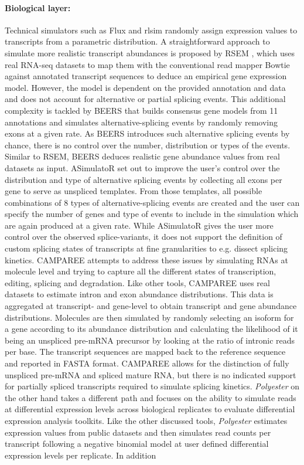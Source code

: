 \paragraph{Biological layer:} Technical simulators such as Flux \citep{Griebel2012} and rlsim \citep{https://doi.org/10.48550/arxiv.1308.3172} randomly assign expression values to transcripts from a parametric distribution. A straightforward approach to simulate more realistic transcript abundances is proposed by RSEM \citep{Li2011}, which uses real RNA-seq datasets to map them with the conventional read mapper Bowtie against annotated transcript sequences to deduce an empirical gene expression model. However, the model is dependent on the provided annotation and data and does not account for alternative or partial splicing events. This additional complexity is tackled by BEERS \citep{Grant2011} that builds consensus gene models from 11 annotations and simulates alternative-splicing events by randomly removing exons at a given rate. As BEERS introduces such alternative splicing events by chance, there is no control over the number, distribution or types of the events. Similar to RSEM, BEERS deduces realistic gene abundance values from real datasets as input. ASimulatoR \citep{Manz2021} set out to improve the user's control over the distribution and type of alternative splicing events by collecting all exons per gene to serve as unspliced templates. From those templates, all possible combinations of 8 types of alternative-splicing events are created and the user can specify the number of genes and type of events to include in the simulation which are again produced at a given rate. While ASimulatoR gives the user more control over the observed splice-variants, it does not support the definition of custom splicing states of transcripts at fine granularities to e.g. dissect splicing kinetics. CAMPAREE \citep{Lahens2021} attempts to address these issues by simulating RNAs at molecule level and trying to capture all the different states of transcription, editing, splicing and degradation. Like other tools, CAMPAREE uses real datasets to estimate intron and exon abundance distributions. This data is aggregated at transcript- and gene-level to obtain transcript and gene abundance distributions. Molecules are then simulated by randomly selecting an isoform for a gene according to its abundance distribution and calculating the likelihood of it being an unspliced pre-mRNA precursor by looking at the ratio of intronic reads per base. The transcript sequences are mapped back to the reference sequence and reported in FASTA format. CAMPAREE allows for the distinction of fully unspliced pre-mRNA and spliced mature RNA, but there is no indicated support for partially spliced transcripts required to simulate splicing kinetics. \textit{Polyester} \citep{Frazee2015} on the other hand takes a different path and focuses on the ability to simulate reads at differential expression levels across biological replicates to evaluate differential expression analysis toolkits. Like the other discussed tools, \textit{Polyester} estimates expression values from public datasets and then simulates read counts per transcript following a negative binomial model at user defined differential expression levels per replicate. In addition 